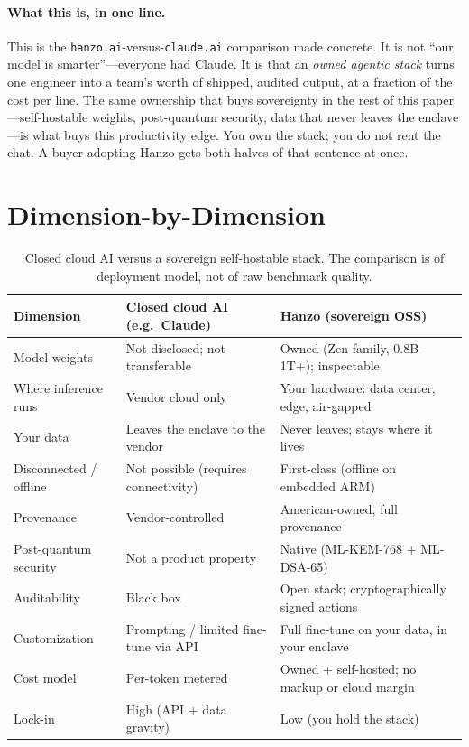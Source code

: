 \documentclass[11pt,letterpaper]{article}
\begin{document}
\paragraph{What this is, in one line.} This is the \texttt{hanzo.ai}-versus-\texttt{claude.ai}
comparison made concrete. It is not ``our model is smarter''---everyone had
Claude. It is that an \emph{owned agentic stack} turns one engineer into a team's
worth of shipped, audited output, at a fraction of the cost per line. The same
ownership that buys sovereignty in the rest of this paper---self-hostable weights,
post-quantum security, data that never leaves the enclave---is what buys this
productivity edge. You own the stack; you do not rent the chat. A buyer adopting
Hanzo gets both halves of that sentence at once.

\section{Dimension-by-Dimension}

\begin{table}[h]
\centering
\small
\begin{tabular}{p{} p{} p{}}
\hline
\textbf{Dimension} & \textbf{Closed cloud AI (e.g.\ Claude)} & \textbf{Hanzo (sovereign OSS)} \\
\hline
Model weights & Not disclosed; not transferable & Owned (Zen family, 0.8B--1T+); inspectable \\
Where inference runs & Vendor cloud only & Your hardware: data center, edge, air-gapped \\
Your data & Leaves the enclave to the vendor & Never leaves; stays where it lives \\
Disconnected / offline & Not possible (requires connectivity) & First-class (offline on embedded ARM) \\
Provenance & Vendor-controlled & American-owned, full provenance \\
Post-quantum security & Not a product property & Native (ML-KEM-768 + ML-DSA-65) \\
Auditability & Black box & Open stack; cryptographically signed actions \\
Customization & Prompting / limited fine-tune via API & Full fine-tune on your data, in your enclave \\
Cost model & Per-token metered & Owned + self-hosted; no markup or cloud margin \\
Lock-in & High (API + data gravity) & Low (you hold the stack) \\
\hline
\end{tabular}
\caption{Closed cloud AI versus a sovereign self-hostable stack. The comparison
is of deployment model, not of raw benchmark quality.}
\end{table}
\end{document}
